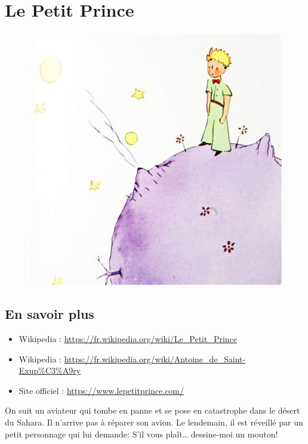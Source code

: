 \newpage

\section*{Le Petit Prince}

\begin{multicols}{2}

  \begin{figure}[H]
    \centering
    \includegraphics[width=0.8\linewidth]{5x6-calcul-litteral/pp.png}
  \end{figure}

\subsection*{En savoir plus}

\begin{itemize}
\item Wikipedia : \url{https://fr.wikipedia.org/wiki/Le_Petit_Prince}
\item Wikipedia : \url{https://fr.wikipedia.org/wiki/Antoine_de_Saint-Exup%C3%A9ry}
\item Site officiel : \url{https://www.lepetitprince.com/}
\end{itemize}


On suit un aviateur qui tombe en panne et se pose en catastrophe dans le désert du Sahara. Il n’arrive pas à réparer son avion. Le lendemain, il est réveillé par un petit personnage qui lui demande: \og S'il vous plaît… dessine-moi un mouton! \fg 

\end{multicols}

